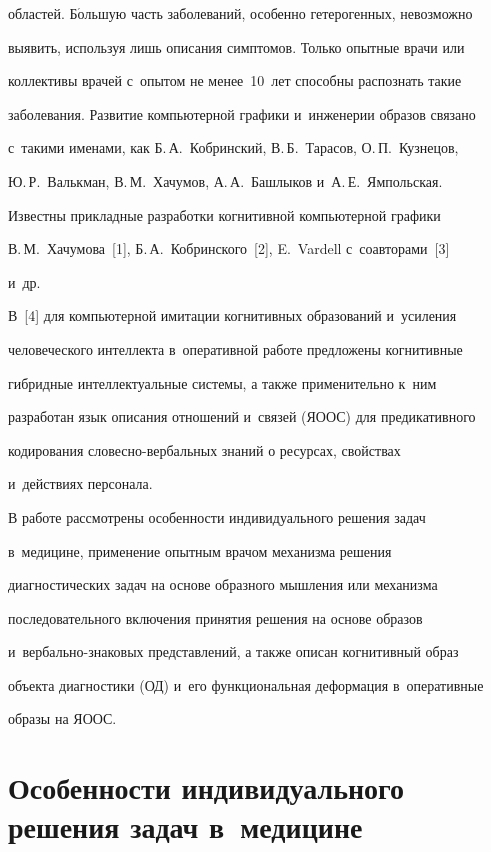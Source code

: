 областей. Б$\acute{\mbox{о}}$льшую часть заболеваний, особенно гетерогенных, невозможно 

выявить, используя лишь описания симптомов. Только опытные врачи или 

коллективы врачей с~опытом не менее~10~лет способны распознать такие 

заболевания. Развитие компьютерной графики и~инженерии образов связано 

с~такими именами, как Б.\,А.~Кобринский, В.\,Б.~Тарасов, О.\,П.~Кузнецов, 

Ю.\,Р.~Валькман, В.\,М.~Хачумов, А.\,А.~Башлыков и~А.\,Е.~Ямпольская. 

Известны прикладные разработки когнитивной компьютерной графики 

В.\,М.~Хачумова~[1], Б.\,А.~Кобринского~[2], E.~Vardell с~соавторами~[3] 

и~др.

  

  В~[4] для компьютерной имитации когнитивных образований и~усиления 

человеческого интеллекта в~оперативной работе предложены когнитивные 

гибридные интеллектуальные системы, а также применительно к~ним 

разработан язык описания отношений и~связей (ЯООС) для предикативного 

кодирования сло\-вес\-но-вер\-баль\-ных знаний о ресурсах, свойствах 

и~действиях персонала.

  

  В работе рассмотрены особенности индивидуального решения задач 

в~медицине, применение опытным врачом механизма решения 

диагностических задач на основе образного мышления или механизма 

последовательного включения принятия решения на основе образов  

и~вер\-баль\-но-зна\-ко\-вых представлений, а также описан когнитивный образ 

объекта диагностики (ОД) и~его функциональная деформация в~оперативные 

образы на ЯООС.

  

\section{Особенности индивидуального решения задач в~медицине}

